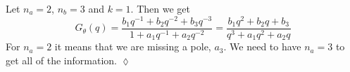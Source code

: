 \begin{example}
Let $n_a=2$, $n_b=3$ and $k=1$. Then we get
$$G_\theta(q) = \frac{b_1q^{-1}+b_2q^{-2}+b_3q^{-3}}{1+a_1q^{-1}+a_2q^{-2}} = \frac{b_1q^2+b_2q+b_3}{q^3+a_1q^2+a_2q}$$
For $n_a=2$ it means that we are missing a pole, $a_3$. We need to have $n_a=3$ to get all of the information.
$\lozenge$
\end{example}


% 

